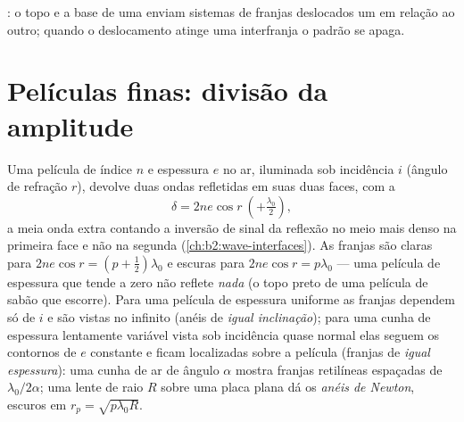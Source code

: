 \begin{omfigure}

{\small {}: o topo e a base de uma 
enviam sistemas de franjas deslocados um em relação ao outro; quando o
deslocamento atinge uma interfranja o padrão se apaga.}
\end{omfigure}

\section{Películas finas: divisão da amplitude}

\begin{proposition}\label{prop:b2:two-wave-interference:film}
Uma película de índice $n$ e espessura $e$ no ar, iluminada sob incidência $i$
(ângulo de refração $r$), devolve duas ondas refletidas em suas duas faces,
com a 
\[
\delta = 2ne\cos r \ (+\tfrac{\lambda_0}2) ,
\]
a meia onda extra contando a inversão de sinal da reflexão
no meio mais denso na primeira face e não na segunda
(\cref{ch:b2:wave-interfaces}). As franjas são claras para $2ne\cos r =
(p + \tfrac12)\lambda_0$ e escuras para $2ne\cos r = p\lambda_0$ --- uma película de espessura
que tende a zero não reflete \emph{nada} (o topo preto de uma película de
sabão que escorre). Para uma película de espessura uniforme as franjas dependem só de $i$
e são vistas no infinito (anéis de \emph{igual inclinação}); para uma
cunha de espessura lentamente variável vista sob incidência quase normal elas
seguem os contornos de $e$ constante e ficam localizadas sobre a película
(franjas de \emph{igual espessura}): uma cunha de ar de ângulo $\alpha$ mostra
franjas retilíneas espaçadas de $\lambda_0/2\alpha$; uma lente de raio $R$ sobre uma placa plana dá
os \emph{anéis de Newton}, escuros em $r_p = \sqrt{p\lambda_0R}$.
\end{proposition}

